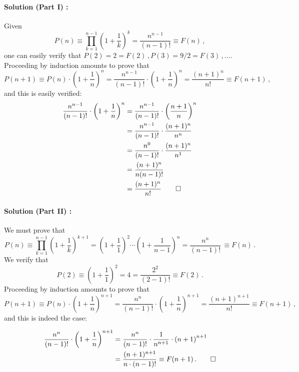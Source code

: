 {{\paragraph{Solution (Part I) :}{
Given $$P(n) \equiv \prod_{k=1}^{n-1} \left(1 + \frac{1}{k} \right)^{k} = \frac{n^{n-1}}{(n - 1)!} \equiv F(n)\,,$$
one can easily verify that $P(2) = 2 = F(2)\,, P(3) = 9/2 = F(3)\,, \ldots$.\\Proceeding by induction amounts to prove that 
$$ P(n+1) \equiv P(n) \cdot \left(1 + \frac{1}{n} \right)^{n} = 
\frac{n^{n-1}}{(n - 1)!} \cdot \left(1 + \frac{1}{n} \right)^{n} = \frac{(n+1)^n}{n!} \equiv F(n+1)\,,$$ 
and this is easily verified:
\begin{align*}
\frac{n^{n-1}}{(n - 1)!} \cdot \left(1 + \frac{1}{n} \right)^{n} &= \frac{n^{n-1}}{(n - 1)!} \cdot {\left(\frac{n + 1}{n}\right)}^n\\
                                                                 &= \frac{n^{n-1}}{(n - 1)!} \cdot  \frac{(n + 1)^n}{n^n} \\
                                                                 &= \frac{n^{0}}{(n - 1)!} \cdot  \frac{(n + 1)^n}{n^1} \\
                                                                 &= \frac{(n + 1)^n}{n (n - 1)!} \\ 
                                                                 &= \frac{(n+1)^n}{n!} \qed 
\end{align*}
}

\paragraph{Solution (Part II) :}{
We must prove that
$$P(n) \equiv \prod_{k=1}^{n-1} \left(1 + \frac{1}{k} \right)^{k+1} = \left(1 + \frac{1}{1} \right)^2 \cdots \left(1 + \frac{1}{n - 1} \right)^{n} = \frac{n^n}{(n-1)!}\, \equiv F(n)\,.$$
We verify that 
$$P(2) \equiv {\left( 1 + \frac{1}{1}  \right)}^2 = 4 = \frac{2^2}{(2 - 1)!} \equiv F(2)\,.$$   
Proceeding by induction amounts to prove that 
$$ P(n+1) \equiv P(n) \cdot \left(1 + \frac{1}{n} \right)^{n+1} = 
\frac{n^n}{(n - 1)!} \cdot \left(1 + \frac{1}{n} \right)^{n+1} = \frac{(n+1)^{n+1}}{n!} \equiv F(n+1)\,,$$ 
and this is indeed the case:

\begin{align*}
\frac{n^n}{(n - 1)!} \cdot \left(1 + \frac{1}{n} \right)^{n+1} &= \frac{n^n}{(n - 1)!} \cdot \frac{1}{n^{n+1}} \cdot {(n + 1)}^{n+1} \\
                                                               &= \frac{(n+1)^{n+1}}{n \cdot (n-1)!} \equiv{F(n+1)\,.} \qed
\end{align*}
}


}}
